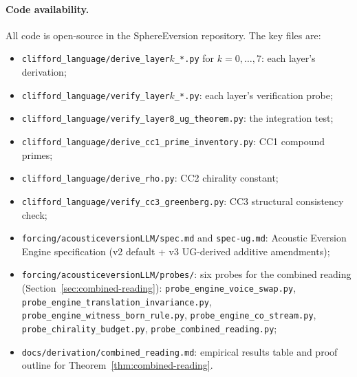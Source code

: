 \documentclass[11pt,a4paper]{article}
\theoremstyle{plain}
\theoremstyle{definition}
\theoremstyle{remark}
\numberwithin{equation}{section}
\begin{document}
\paragraph{Code availability.}
All code is open-source in the SphereEversion repository.  The
key files are:
\begin{itemize}\setlength{\itemsep}{0pt}
\item \texttt{clifford\_language/derive\_layer$k$\_*.py} for
      $k = 0, \ldots, 7$: each layer's derivation;
\item \texttt{clifford\_language/verify\_layer$k$\_*.py}: each
      layer's verification probe;
\item \texttt{clifford\_language/verify\_layer8\_ug\_theorem.py}:
      the integration test;
\item \texttt{clifford\_language/derive\_cc1\_prime\_inventory.py}:
      CC1 compound primes;
\item \texttt{clifford\_language/derive\_rho.py}: CC2 chirality
      constant;
\item \texttt{clifford\_language/verify\_cc3\_greenberg.py}: CC3
      structural consistency check;
\item \texttt{forcing/acousticeversionLLM/spec.md} and
      \texttt{spec-ug.md}: Acoustic Eversion Engine
      specification (v2 default + v3 UG-derived additive
      amendments);
\item \texttt{forcing/acousticeversionLLM/probes/}: six probes
      for the combined reading (Section~\ref{sec:combined-reading}):
      \texttt{probe\_engine\_voice\_swap.py},
      \texttt{probe\_engine\_translation\_invariance.py},
      \texttt{probe\_engine\_witness\_born\_rule.py},
      \texttt{probe\_engine\_co\_stream.py},
      \texttt{probe\_chirality\_budget.py},
      \texttt{probe\_combined\_reading.py};
\item \texttt{docs/derivation/combined\_reading.md}: empirical
      results table and proof outline for
      Theorem~\ref{thm:combined-reading}.
\end{itemize}
\end{document}
